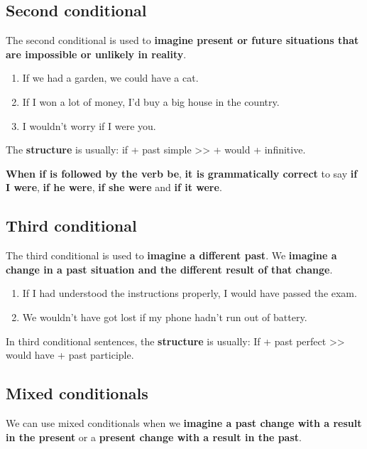\documentclass{article}
\begin{document}
\subsection{Second conditional}

The second conditional is used to \textbf{imagine present or future situations that are impossible or unlikely in reality}.

\begin{enumerate}
	\item If we had a garden, we could have a cat.
	\item If I won a lot of money, I'd buy a big house in the country.
	\item I wouldn't worry if I were you.
\end{enumerate}

The \textbf{structure} is usually: if + past simple >> + would + infinitive. 

\textbf{When if is followed by the verb be}, \textbf{it is grammatically correct} to say \textbf{if I were}, \textbf{if he were}, \textbf{if she were} and \textbf{if it were}.

\subsection{Third conditional}

The third conditional is used to \textbf{imagine a different past}. We \textbf{imagine a change in a past situation and the different result of that change}.

\begin{enumerate}
	\item If I had understood the instructions properly, I would have passed the exam.
	\item We wouldn't have got lost if my phone hadn't run out of battery.
\end{enumerate}

In third conditional sentences, the \textbf{structure} is usually: If + past perfect >> would have + past participle.

\subsection{Mixed conditionals}

We can use mixed conditionals when we \textbf{imagine a past change with a result in the present} or a \textbf{present change with a result in the past}.
\end{document}
